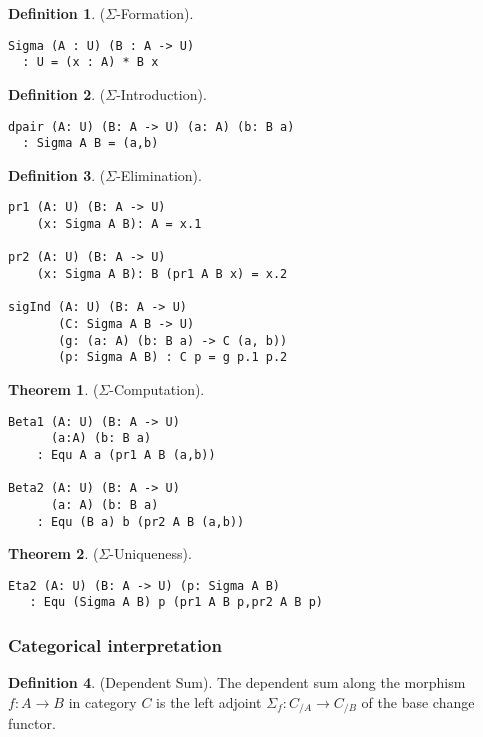 \documentclass{article}
\theoremstyle{definition}
\newtheorem{theorem}{Theorem}
\newtheorem{definition}{Definition}
\begin{document}
\begin{definition} ($\Sigma$-Formation).
\begin{lstlisting}
Sigma (A : U) (B : A -> U)
  : U = (x : A) * B x
\end{lstlisting}
\end{definition}

\begin{definition} ($\Sigma$-Introduction).
\begin{lstlisting}
dpair (A: U) (B: A -> U) (a: A) (b: B a)
  : Sigma A B = (a,b)
\end{lstlisting}
\end{definition}

\begin{definition} ($\Sigma$-Elimination).
\begin{lstlisting}
pr1 (A: U) (B: A -> U)
    (x: Sigma A B): A = x.1

pr2 (A: U) (B: A -> U)
    (x: Sigma A B): B (pr1 A B x) = x.2

sigInd (A: U) (B: A -> U)
       (C: Sigma A B -> U)
       (g: (a: A) (b: B a) -> C (a, b))
       (p: Sigma A B) : C p = g p.1 p.2
\end{lstlisting}
\end{definition}

\begin{theorem} ($\Sigma$-Computation).
\begin{lstlisting}
Beta1 (A: U) (B: A -> U)
      (a:A) (b: B a)
    : Equ A a (pr1 A B (a,b))

Beta2 (A: U) (B: A -> U)
      (a: A) (b: B a)
    : Equ (B a) b (pr2 A B (a,b))
\end{lstlisting}
\end{theorem}

\begin{theorem} ($\Sigma$-Uniqueness).
\begin{lstlisting}
Eta2 (A: U) (B: A -> U) (p: Sigma A B)
   : Equ (Sigma A B) p (pr1 A B p,pr2 A B p)
\end{lstlisting}
\end{theorem}

\subsubsection*{Categorical interpretation}

\begin{definition} (Dependent Sum).
The dependent sum along the morphism $f: A \rightarrow B$ in category $C$ is the left
adjoint $\Sigma_f : C_{/A} \rightarrow C_{/B}$ of the base change functor.
\end{definition}
\end{document}
